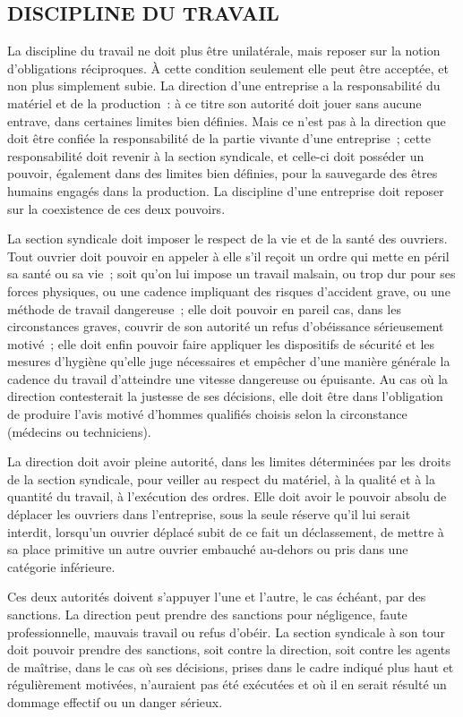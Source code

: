 \documentclass[french,twoside]{book} %
\begin{document}
\subsection[DISCIPLINE DU TRAVAIL]{DISCIPLINE DU TRAVAIL}
\noindent La discipline du travail ne doit plus être unilatérale, mais reposer sur la notion d'obligations réciproques. À cette condition seulement elle peut être acceptée, et non plus simplement subie. La direction d'une entreprise a la responsabilité du matériel et de la production : à ce titre son autorité doit jouer sans aucune entrave, dans certaines limites bien définies. Mais ce n'est pas à la direction que doit être confiée la responsabilité de la partie vivante d'une entreprise ; cette responsabilité doit revenir à la section syndicale, et celle-ci doit posséder un pouvoir, également dans des limites bien définies, pour la sauvegarde des êtres humains engagés dans la production. La discipline d'une entreprise doit reposer sur la coexistence de ces deux pouvoirs.\par
La section syndicale doit imposer le respect de la vie et de la santé des ouvriers. Tout ouvrier doit pouvoir en appeler à elle s'il reçoit un ordre qui mette en péril sa santé ou sa vie ; soit qu'on lui impose un travail malsain, ou trop dur pour ses forces physiques, ou une cadence impliquant des risques d'accident grave, ou une méthode de travail dangereuse ; elle doit pouvoir en pareil cas, dans les circonstances graves, couvrir de son autorité un refus d'obéissance sérieusement motivé ; elle doit enfin pouvoir faire appliquer les dispositifs de sécurité et les mesures d'hygiène qu'elle juge nécessaires et empêcher d'une manière générale la cadence du travail d'atteindre une vitesse dangereuse ou épuisante. Au cas où la direction contesterait la justesse de ses décisions, elle doit être dans l'obligation de produire l'avis motivé d'hommes qualifiés choisis selon la circonstance (médecins ou techniciens).\par
La direction doit avoir pleine autorité, dans les limites déterminées par les droits de la section syndicale, pour veiller au respect du matériel, à la qualité et à la quantité du travail, à l'exécution des ordres. Elle doit avoir le pouvoir absolu de déplacer les ouvriers dans l'entreprise, sous la seule réserve qu'il lui serait interdit, lorsqu'un ouvrier déplacé subit de ce fait un déclassement, de mettre à sa place primitive un autre ouvrier embauché au-dehors ou pris dans une catégorie inférieure.\par
Ces deux autorités doivent s'appuyer l'une et l'autre, le cas échéant, par des sanctions. La direction peut prendre des sanctions pour négligence, faute professionnelle, mauvais travail ou refus d'obéir. La section syndicale à son tour doit pouvoir prendre des sanctions, soit contre la direction, soit contre les agents de maîtrise, dans le cas où ses décisions, prises dans le cadre indiqué plus haut et régulièrement motivées, n'auraient pas été exécutées et où il en serait résulté un dommage effectif ou un danger sérieux.\par
\end{document}
